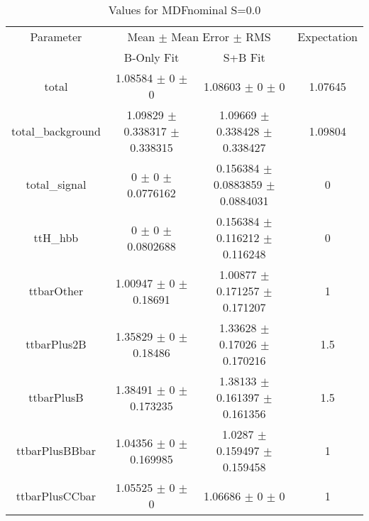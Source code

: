 \begin{table}
\centering
\caption{Values for MDFnominal S=0.0}
\begin{tabular}{cccc}
\toprule
Parameter & \multicolumn{2}{c}{Mean $\pm$ Mean Error $\pm$ RMS} & Expectation\\
 & B-Only Fit & S+B Fit & \\
\midrule
total & \num{1.08584} $\pm$ \num{0} $\pm$ \num{0} & \num{1.08603} $\pm$ \num{0} $\pm$ \num{0} & \num{1.07645}\\
total\_background & \num{1.09829} $\pm$ \num{0.338317} $\pm$ \num{0.338315} & \num{1.09669} $\pm$ \num{0.338428} $\pm$ \num{0.338427} & \num{1.09804}\\
total\_signal & \num{0} $\pm$ \num{0} $\pm$ \num{0.0776162} & \num{0.156384} $\pm$ \num{0.0883859} $\pm$ \num{0.0884031} & \num{0}\\
ttH\_hbb & \num{0} $\pm$ \num{0} $\pm$ \num{0.0802688} & \num{0.156384} $\pm$ \num{0.116212} $\pm$ \num{0.116248} & \num{0}\\
ttbarOther & \num{1.00947} $\pm$ \num{0} $\pm$ \num{0.18691} & \num{1.00877} $\pm$ \num{0.171257} $\pm$ \num{0.171207} & \num{1}\\
ttbarPlus2B & \num{1.35829} $\pm$ \num{0} $\pm$ \num{0.18486} & \num{1.33628} $\pm$ \num{0.17026} $\pm$ \num{0.170216} & \num{1.5}\\
ttbarPlusB & \num{1.38491} $\pm$ \num{0} $\pm$ \num{0.173235} & \num{1.38133} $\pm$ \num{0.161397} $\pm$ \num{0.161356} & \num{1.5}\\
ttbarPlusBBbar & \num{1.04356} $\pm$ \num{0} $\pm$ \num{0.169985} & \num{1.0287} $\pm$ \num{0.159497} $\pm$ \num{0.159458} & \num{1}\\
ttbarPlusCCbar & \num{1.05525} $\pm$ \num{0} $\pm$ \num{0} & \num{1.06686} $\pm$ \num{0} $\pm$ \num{0} & \num{1}\\
\bottomrule
\end{tabular}
\end{table}